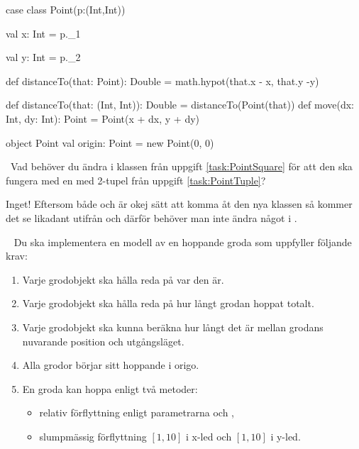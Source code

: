 \SOLUTION


\TaskSolved \what
  \begin{CodeSmall}
case class Point(p:(Int,Int)) {
	val x: Int = p._1

	val y: Int = p._2

	def distanceTo(that: Point): Double = math.hypot(that.x - x, that.y -y)

	def distanceTo(that: (Int, Int)): Double = distanceTo(Point(that))
	def move(dx: Int, dy: Int): Point = Point(x + dx, y + dy)
}

object Point {
	val origin: Point = new Point(0, 0)
}
\end{CodeSmall}



\QUESTEND









\QUESTBEGIN

\Task  \what~\Pen Vad behöver du ändra i klassen  från uppgift \ref{task:PointSquare} för att den ska fungera med en  med 2-tupel från uppgift \ref{task:PointTuple}?

\SOLUTION


\TaskSolved \what
 Inget! Eftersom både  och  är okej sätt att komma åt den nya klassen så kommer det se likadant utifrån och därför behöver man inte ändra något i .


\QUESTEND







\QUESTBEGIN

\Task  \what~  Du ska implementera en modell av en hoppande groda som uppfyller följande krav:
\begin{enumerate}
\item Varje grodobjekt ska hålla reda på var den är.
\item Varje grodobjekt ska hålla reda på hur långt grodan hoppat totalt.
\item Varje grodobjekt ska kunna beräkna hur långt det är mellan grodans nuvarande position och utgångsläget.
\item Alla grodor börjar sitt hoppande i origo.
\item En groda kan hoppa enligt två metoder:
  \begin{itemize} [nolistsep, noitemsep]
  \item relativ förflyttning enligt parametrarna  och ,
  \item slumpmässig förflyttning $[1, 10]$ i x-led och $[1, 10]$ i y-led.
  \end{itemize}
\end{enumerate}

